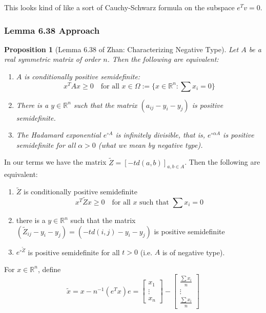 \documentclass[11pt]{article}
\theoremstyle{definition}
\theoremstyle{definition}
\theoremstyle{plain}
\theoremstyle{plain}
\newtheorem*{prop}{Proposition}
\theoremstyle{plain}
\theoremstyle{definition}
\begin{document}
This looks kind of like a sort of Cauchy-Schwarz formula on the subspace $e^Tv=0$.

\subsubsection*{Lemma 6.38 Approach}
\begin{prop}[Lemma 6.38 of Zhan: Characterizing Negative Type]
Let $A$ be a real symmetric matrix of order $n$. Then the following are equivalent:
\begin{enumerate}
\item $A$ is conditionally positive semidefinite:
\begin{equation*}
x^TAx \geq 0 \quad\text{for all $x \in \Omega:=\{x \in \mathbb{R}^n : \sum x_i = 0\}$}
\end{equation*}
\item There is a $y \in \mathbb{R}^n$ such that the matrix $(a_{ij} - y_i - y_j)$ is positive semidefinite.
\item The Hadamard exponential $e^{\circ A}$ is infinitely divisible, that is, $e^{\circ \alpha A}$ is positive semidefinite for all $\alpha > 0$ (what we mean by negative type).
\end{enumerate}
\end{prop}

In our terms we have the matrix $\tilde{Z} = [-td(a,b)]_{a,b \in A}$. Then the following are equivalent:

\begin{enumerate}
\item $\tilde{Z}$ is conditionally positive semidefinite
\begin{equation*}
x^T\tilde{Z}x \geq 0 \quad\text{for all $x$ such that $\sum x_i = 0$}
\end{equation*}
\item there is a $y \in \mathbb{R}^n$ such that the matrix $(\tilde{Z}_{ij}-y_i-y_j) = (-td(i,j) - y_i - y_j)$ is positive semidefinite
\item $e^{\circ \tilde{Z}}$ is positive semidefinite for all $t > 0$ (i.e. $A$ is of negative type).
\end{enumerate}

For $x \in \mathbb{R}^n$, define
\begin{equation*}
\tilde{x} = x - n^{-1}(e^Tx)e = \begin{bmatrix} x_1 \\ \vdots \\ x_n \end{bmatrix} - \begin{bmatrix} \frac{\sum x_i}{n} \\ \vdots \\ \frac{\sum x_i}{n} \end{bmatrix}
\end{equation*}
\end{document}
